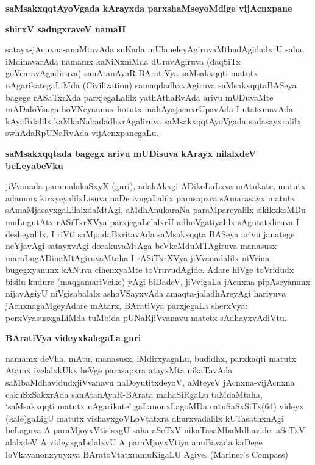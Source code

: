 {\medskip
\noindent
{\large\bf saMsakxqqtAyoVgada kArayxda parxshaMseyoMdige vijAcnxpane}}\label{page21}

\bigskip

{\centerline{\large\bf{shirxV sadugxraveV namaH}}}

\medskip

satayx-jAcnxna-anaMtavAda suKada mUlaneleyAgiruvaMthadAgidadxrU saha, iMdinavarAda\- namamx kaNiNx\-niMda dUravAgiruva (daqSiTx goVcaravAgadiruva) sanA\-tanAyaR BAratiVya saMsakxqqti matutx nAgari\-kategaLiMda {\rm (Civilization)} samaqdadhx\-vAgiruva saMsakxqqtaBASeya bagege rASaTxrXda parxjegaLalilx yathAthaR\-vAda arivu mUDuvaMte mADaloVsuga hoVNeyanunx hotutx mahAyajacnxrUpavAda I utatxma\-vAda kAyaRdalilx kaMkaNabadadhxrAgaliruva saMsakxqqtAyoVgada sadasayxralilx swhAdaRpUNaRvAda vijAcnx\-pane\-gaLu.

{\medskip
\noindent
{\large\bf saMsakxqqtada bagegx arivu mUDisuva kArayx nilalxdeV beLeyabeVku}}\label{page21}
\medskip

\noindent
jiVvanada paramalakaSxyX (guri), adakAkxgi ADikoLuLxva mAtukate, matutx adanunx kirxyeyalilxLisuva naDe ivugaLalilx parasapxra sAmarasayx matutx sAmaMjasayxgaLilalxdaMtAgi, aMdhAnukaraNa paraMpareyalilx sikikx\-koMDu muLugutAtx rASiTxrXVya parxjegaLelalxrU adhoVgatiyalilx sAgutatxliruva I desheyalilx, I riVti saMpadaBx\-ritavAda saMsakxqqta BASeya arivu janatege neYjavAgi-satayxvAgi dorakuvaMtAga beVkeM\-duMTA\-giruva manasusx maraLugADinaMtAgiruvaMtaha I rASiTxrXVya jiVvanadalilx niVrina bugegx\break\-yanunx kANuva cihenx\-yaMte toVruvudAgide. Adare hiVge toVridudx bisilu kudure (maqgamariVcike) yAgi biDadeV, jiVvi\-gaLa jAcnxna pipAseyanunx nija\break\-vAgiyU niVgisabalalx ashoVSayxvAda amaqta-jaladhAreyAgi hari\-yuva jAcnxna\-gaMgeyAdare mAtarx, BAratiVya parxjegaLa sherxVya: perxVyasusxgaLiMda tuMbida pUNaR\-jiVva\-navu matetx sAdhayxvAdiVtu.

{\medskip
\noindent
{\large\bf BAratiVya videyxkalegaLa guri}}\label{page22}
\medskip

\noindent
namamx deVha, mAtu, manasusx, iMdirxyagaLu, budidhx, parxkaqti matutx Atamx ivelalxkUkx heVge parasapxra atayxMta nikaTa\-vAda saMbaMdhavidudxjiVvanavu naDeyutitxdeyoV, aMteyeV jAcnxna-vijAcnxna cakuSxSakxrAda sanAta\-nAyaR-BArata mahaSiRgaLu taMdaMtaha, `saMsakxqqti matutx nAgarikate' gaLanonxLagoMDa catu\-SaSxSiTx(64) videyx (kale)gaLigU matutx vishavxgoVLoVtatxra dhurxvadalilx kUTasathxnAgi beLaguva A paraMjoyxVti\-sisxgU saha aSeTxV nikaTasaMbaMdhavide. aSeTxV
alalxdeV A videyxgaLelalxvU A paraMjoyxVtiya anuBavada kaDege loVka\-vanonxyuyxva BAratoVtatxramuKigaLU Agive. {(\rm Mariner's Compass)}

